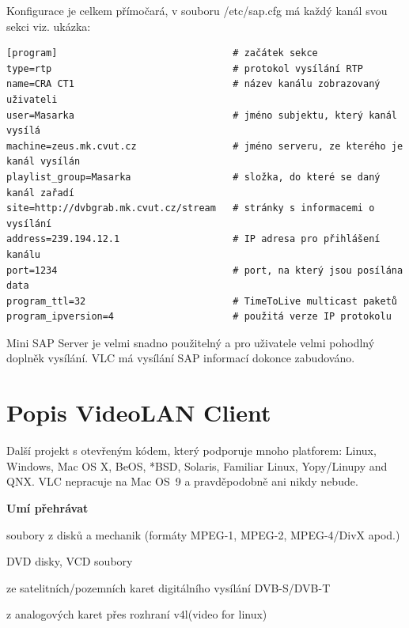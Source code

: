 Konfigurace je celkem přímočará, v souboru /etc/sap.cfg má každý kanál svou sekci viz. ukázka: 

\vspace{10pt}

\begin{small}
\begin{verbatim}
[program]                               # začátek sekce
type=rtp                                # protokol vysílání RTP
name=CRA CT1                            # název kanálu zobrazovaný uživateli
user=Masarka                            # jméno subjektu, který kanál vysílá
machine=zeus.mk.cvut.cz                 # jméno serveru, ze kterého je kanál vysílán
playlist_group=Masarka                  # složka, do které se daný kanál zařadí
site=http://dvbgrab.mk.cvut.cz/stream   # stránky s informacemi o vysílání
address=239.194.12.1                    # IP adresa pro přihlášení kanálu
port=1234                               # port, na který jsou posílána data
program_ttl=32                          # TimeToLive multicast paketů
program_ipversion=4                     # použitá verze IP protokolu
\end{verbatim}
\end{small}

\vspace{10pt}

Mini SAP Server je velmi snadno použitelný a pro uživatele velmi pohodlný doplněk vysílání. VLC má vysílání SAP informací dokonce zabudováno.

\vspace{10pt}

\section{Popis VideoLAN Client}

Další projekt s otevřeným kódem, který podporuje mnoho platforem: Linux, Windows, Mac OS X, BeOS, *BSD, Solaris, Familiar Linux, Yopy/Linupy and QNX. VLC nepracuje na Mac OS\ 9 a pravděpodobně ani nikdy nebude.

\vspace{10pt}

\textbf{Umí přehrávat}

soubory z disků a mechanik (formáty MPEG-1, MPEG-2, MPEG-4/DivX apod.)

DVD disky, VCD soubory

ze satelitních/pozemních karet digitálního vysílání DVB-S/DVB-T

z analogových karet přes rozhraní v4l(video for linux)

